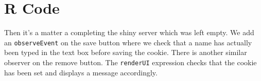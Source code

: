 \documentclass[
]{krantz}
\makeatletter
\newenvironment{Shaded}{\begin{snugshade}}{\end{snugshade}}
\newcommand{\AttributeTok}[1]{\textcolor[rgb]{0.61,0.61,0.61}{#1}}
\newcommand{\CommentTok}[1]{\textcolor[rgb]{0.37,0.37,0.37}{\textit{#1}}}
\newcommand{\KeywordTok}[1]{\textcolor[rgb]{0.27,0.27,0.27}{\textbf{#1}}}
\newcommand{\NormalTok}[1]{#1}
\newcommand{\OperatorTok}[1]{\textcolor[rgb]{0.43,0.43,0.43}{\textbf{#1}}}
\newcommand{\StringTok}[1]{\textcolor[rgb]{0.5,0.5,0.5}{#1}}
\newenvironment{kframe}{%
\medskip{}
\setlength{\fboxsep}{.8em}
 \def\at@end@of@kframe{}%
 \ifinner\ifhmode%
  \def\at@end@of@kframe{\end{minipage}}%
  \begin{minipage}{\columnwidth}%
 \fi\fi%
 \def\FrameCommand##1{\hskip\@totalleftmargin \hskip-\fboxsep
 \colorbox{shadecolor}{##1}\hskip-\fboxsep
     \hskip-\linewidth \hskip-\@totalleftmargin \hskip\columnwidth}%
 \MakeFramed {\advance\hsize-\width
   \@totalleftmargin\z@ \linewidth\hsize
   \@setminipage}}%
 {\par\unskip\endMakeFramed%
 \at@end@of@kframe}
\renewenvironment{Shaded}{\begin{kframe}}{\end{kframe}}
\makeatother
\begin{document}
\begin{Shaded}
\end{Shaded}

\hypertarget{r-code}{%
\section{R Code}\label{r-code}}

Then it's a matter a completing the shiny server which was left empty. We add an \texttt{observeEvent} on the save button where we check that a name has actually been typed in the text box before saving the cookie. There is another similar observer on the remove button. The \texttt{renderUI} expression checks that the cookie has been set and displays a message accordingly.
\end{document}
